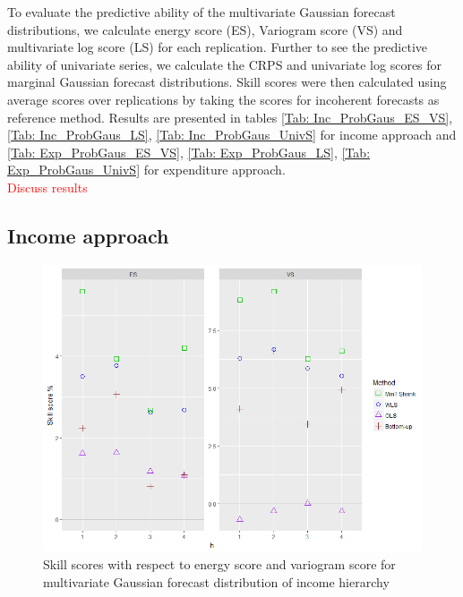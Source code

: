 \documentclass[graybox]{svmult}
\begin{document}
To evaluate the predictive ability of the multivariate Gaussian forecast distributions, we calculate energy score (ES), Variogram score (VS) and multivariate log score (LS) for each replication. Further to see the predictive ability of univariate series, we calculate the CRPS and univariate log scores for marginal Gaussian forecast distributions. Skill scores were then calculated using average scores over replications by taking the scores for incoherent forecasts as reference method. Results are presented in tables \ref{Tab: Inc_ProbGaus_ES_VS}, \ref{Tab: Inc_ProbGaus_LS}, \ref{Tab: Inc_ProbGaus_UnivS} for income approach and \ref{Tab: Exp_ProbGaus_ES_VS}, \ref{Tab: Exp_ProbGaus_LS}, \ref{Tab: Exp_ProbGaus_UnivS} for expenditure approach. \\

\textcolor{red}{Discuss results}


\subsection*{Income approach}

\begin{figure}[H]
	\centering
	\small
	\includegraphics[scale=0.50]{Figs/Results/INC-ProbGaussF-MultivS_ES_VS.png}
	\caption{Skill scores with respect to energy score and variogram score for multivariate Gaussian forecast distribution of income hierarchy}\label{Inc_ProbGaus_ES_VS}
\end{figure}
\end{document}
